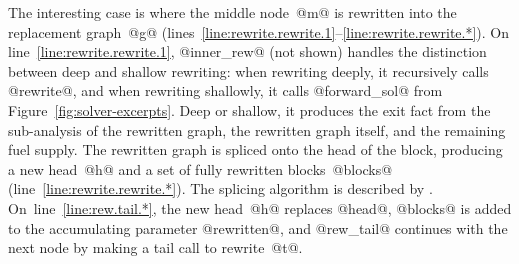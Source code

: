 \documentclass[blockstyle,preprint,nocopyrightspace]{sigplanconf}
\newcommand\lineref[1]{line~\ref{line:#1}}
\newcommand\linerangeref[2]{\mbox{lines~\ref{line:#1}--\ref{line:#2}}}
\newcommand\figref[1]{Figure~\ref{fig:#1}}
\begin{document}
The interesting case is where the middle node~@m@ is rewritten into
the replacement graph~@g@ (\linerangeref{rewrite.rewrite.1}{rewrite.rewrite.*}).
On \lineref{rewrite.rewrite.1}, @inner_rew@ (not shown) handles the
distinction between deep and shallow rewriting:
when rewriting deeply, it recursively calls @rewrite@,
and 
when rewriting shallowly, it calls @forward_sol@ from
\figref{solver-excerpts}. 
Deep or shallow, it produces the exit fact from the sub-analysis of
the rewritten graph, 
the rewritten graph itself, 
and the remaining fuel supply.
The rewritten graph is
spliced onto the head of the block, producing a new head~@h@ and a set
of fully rewritten blocks~@blocks@ (\lineref{rewrite.rewrite.*}).
The splicing algorithm is described by
\citet{ramsey-dias:applicative-control-flow}. 
On~\lineref{rew.tail.*}, 
the new head~@h@ replaces @head@, @blocks@ is added to the
accumulating parameter @rewritten@, and
@rew_tail@ continues with the next node by making a tail call
to rewrite~@t@.
\end{document}
